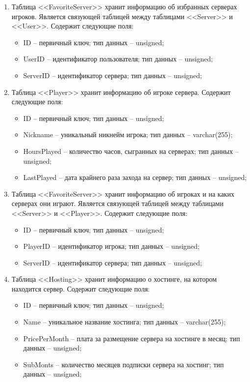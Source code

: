 \begin{enumerate}
        \item Таблица <<FavoriteServer>> хранит информацию об избранных серверах игроков. Является связующей таблицей между таблицами <<Server>> и <<User>>. Содержит следующие поля:
        \begin{itemize}
            \item ID -- первичный ключ; тип данных -- unsigned;
            \item UserID -- идентификатор пользователя; тип данных -- unsigned;
            \item ServerID -- идентификатор сервера; тип данных -- unsigned;
        \end{itemize}

        \item Таблица <<Player>> хранит информацию об игроке сервера. Содержит следующие поля:
        \begin{itemize}
            \item ID -- первичный ключ; тип данных -- unsigned;
            \item Nickname -- уникальный никнейм игрока; тип данных -- varchar(255);
            \item HoursPlayed -- количество часов, сыгранных на серверах; тип данных -- unsigned;
            \item LastPlayed -- дата крайнего раза захода на сервер; тип данных -- unsigned;
        \end{itemize}

        \item Таблица <<FavoriteServer>> хранит информацию об игроках и на каких серверах они играют. Является связующей таблицей между таблицами <<Server>> и <<Player>>. Содержит следующие поля:
        \begin{itemize}
            \item ID -- первичный ключ; тип данных -- unsigned;
            \item PlayerID -- идентификатор игрока; тип данных -- unsigned;
            \item ServerID -- идентификатор сервера; тип данных -- unsigned;
        \end{itemize}

        \item Таблица <<Hosting>> хранит информацию о хостинге, на котором находится сервер. Содержит следующие поля:
        \begin{itemize}
            \item ID -- первичный ключ; тип данных -- unsigned;
            \item Name -- уникальное название хостинга; тип данных -- varchar(255);
            \item PricePerMonth -- плата за размещение сервера на хостинге в месяц; тип данных -- unsigned;
            \item SubMonts -- количество месяцев подписки сервера на хостинг; тип данных -- unsigned;
        \end{itemize}


\end{enumerate}
